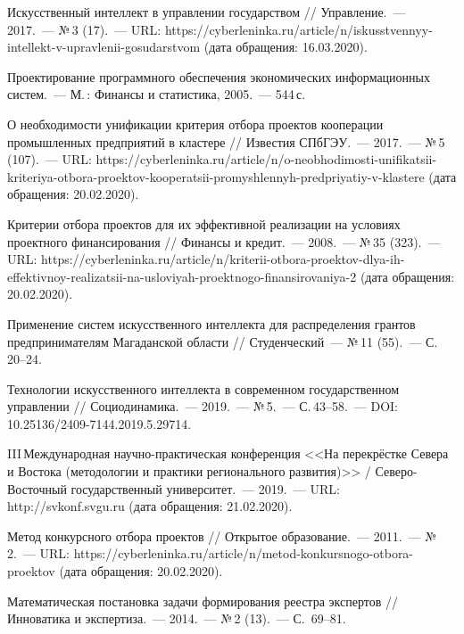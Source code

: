 \begin{thebibliography}{99}

\bibitem{} Искусственный интеллект в управлении государством // Управление.~--- 2017.~--- №\,3 (17).~--- URL: https://cyberleninka.ru/\-arti\-cle/\-n/iskus\-stven\-nyy-intel\-lekt-v-up\-rav\-lenii-gosu\-dars\-tvom (дата обращения: 16.03.2020).

\bibitem{} Проектирование программного обеспечения экономических информационных систем.~--- М.\,: Финансы и статистика, 2005.~--- 544\,с.

\bibitem{} О необходимости унификации критерия отбора проектов кооперации промышленных предприятий в кластере // Известия СПбГЭУ.~--- 2017.~--- №\,5 (107).~--- URL: https://cyberleninka.ru/article/n/o-neobhodimosti-unifikatsii-kriteriya-otbora-proektov-kooperatsii-promyshlennyh-predpriyatiy-v-klastere (дата обращения: 20.02.2020).

\bibitem{} Критерии отбора проектов для их эффективной реализации на условиях проектного финансирования // Финансы и кредит.~--- 2008.~--- №\,35 (323).~--- URL: https://cyberleninka.ru/article/n/kriterii-otbora-proektov-dlya-ih-effektivnoy-realizatsii-na-usloviyah-proektnogo-finansirovaniya-2 (дата обращения: 20.02.2020).

\bibitem{} Применение систем искусственного интеллекта для распределения грантов предпринимателям Магаданской области // Студенческий~--- №\,11 (55).~--- С.\,20--24.

\bibitem{} Технологии искусственного интеллекта в современном государственном управлении // Социодинамика.~--- 2019.~--- №\,5.~--- С.\,43--58.~--- DOI: 10.25136/2409-7144.2019.5.29714.

\bibitem{}III\,Международная научно-практическая конференция <<На перекрёстке Севера и Востока (методологии и практики регионального развития)>> / Северо-Восточный государственный университет.~--- 2019.~--- URL: http://svkonf.svgu.ru (дата обращения: 21.02.2020).

\bibitem{} Метод конкурсного отбора проектов // Открытое образование.~--- 2011.~--- №\,2.~--- URL: https://cyberleninka.ru/article/n/metod-konkursnogo-otbora-proektov (дата обращения: 20.02.2020).

\bibitem{} Математическая постановка задачи формирования реестра экспертов // Инноватика и экспертиза.~--- 2014.~--- №\,2 (13).~--- С.~69--81.


\end{thebibliography}
